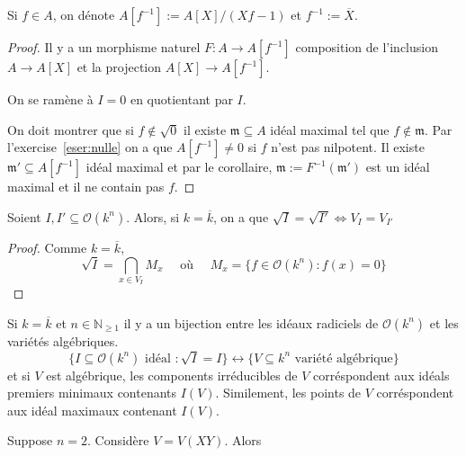 \begin{note}[zione]
    Si \(f \in A\), on dénote \(A[f^{-1}] := A[X] / {(Xf - 1)}\) et \(f^{-1} :=
    \overline{X}\).
\end{note}
\begin{proof}{}
    Il y a un morphisme naturel \(F: A \to A[f^{-1}]\) composition de l'inclusion
    \(A \to A[X]\) et la projection \(A[X] \to A[f^{-1}]\).

    On se ramène à \(I = 0\) en quotientant par \(I\).

    On doit montrer que si \(f \not\in  \sqrt{0}\) il existe \(\mathfrak{m}
    \subseteq A \) idéal maximal tel que \(f \not\in  \mathfrak{m}\). Par
    l'exercise~\ref{eser:nulle} on a que \(A[f^{-1}] \neq 0\) si \(f\) n'est pas
    nilpotent. Il existe \(\mathfrak{m}' \subseteq A[f^{-1}] \) idéal maximal et
    par le corollaire, \(\mathfrak{m} := F^{-1}{(\mathfrak{m}')}\) est un idéal
    maximal et il ne contain pas \(f\).
\end{proof}

\begin{corollary}{}
    Soient \(I, I' \subseteq \mathcal{O}{(k^{n})} \). Alors, si \(k =
    \overline{k}\), on a que \(\sqrt{I} = \sqrt{I'} \iff V_I = V_{I'} \) 
\end{corollary}

\begin{proof}{}
    Comme \(k = \overline{k}\), 
    \[
      \sqrt{I} = \bigcap_{x \in V_I} M_x \quad \text{ où } \quad M_x = \{f \in
      \mathcal{O}{(k^{n})} : f{(x)} = 0\} 
    \]
\end{proof}

\begin{corollary}{}
    Si \(k = \overline{k}\) et \(n \in \mathbb{N}_{\ge 1} \) il y a un bijection
    entre les idéaux radiciels de \(\mathcal{O}{(k^{n})}\) et les variétés
    algébriques.
    \[
\{I \subseteq \mathcal{O}{(k^{n})}\text{ idéal } : \sqrt{I} = I \}
\leftrightarrow \{ V \subseteq k^{n} \text{ variété algébrique} \} 
    \]
    et si \(V\) est algébrique, les components irréducibles de \(V\)
    corréspondent aux idéals premiers minimaux contenants \(I{(V)}\).
    Similement, les points de \(V\) corréspondent aux idéal maximaux contenant
    \(I{(V)}\).
\end{corollary}

\begin{eser}{}
    Suppose \(n=2\). Considère \(V = V{(XY)}\). Alors 

\end{eser}


